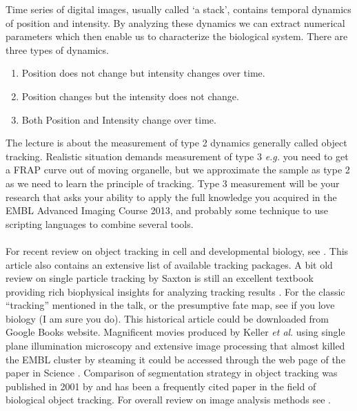 \documentclass[11pnt]{article}
\begin{document}
Time series of digital images, usually called ‘a stack’, contains temporal dynamics of position and intensity. By analyzing these dynamics we can extract numerical parameters which then enable us to characterize the biological system. There are three types of dynamics. 
\begin{enumerate}
\item Position does not change but intensity changes over time. 
\item Position changes but the intensity does not change. 
\item Both Position and Intensity change over time. 
\end{enumerate}
The lecture is about the measurement of type 2 dynamics generally called object tracking. Realistic situation demands measurement of type 3 \textit{e.g.} you need to get a FRAP curve out of moving organelle, but we approximate the sample as type 2 as we need to learn the principle of tracking. Type 3 measurement will be your research that asks your ability to apply the full knowledge you acquired in the EMBL Advanced Imaging Course 2013, and probably some technique to use scripting languages to combine several tools.  
\\
\\
For recent review on object tracking in cell and developmental biology, see \cite{Meijering2012}. This article also contains an extensive list of available tracking packages. A bit old review on single particle tracking by Saxton is still an excellent textbook providing rich biophysical insights for analyzing tracking results \citep{Saxton1997}. For the classic ``tracking'' mentioned in the talk, or the presumptive fate map, see \cite{Vogt1925} if you love biology (I am sure you do). This historical article could be downloaded from Google Books website. Magnificent movies produced by Keller \textit{et al}. using single plane illumination microscopy and extensive image processing that almost killed the EMBL cluster by steaming it could be accessed through the web page of the paper in Science \citep{Keller2008}. Comparison of segmentation strategy in object tracking was published in 2001 by \cite{Cheezum2001a} and has been a frequently cited paper in the field of biological object tracking. For overall review on image analysis methods see \cite{Hamilton2009}.
\end{document}
